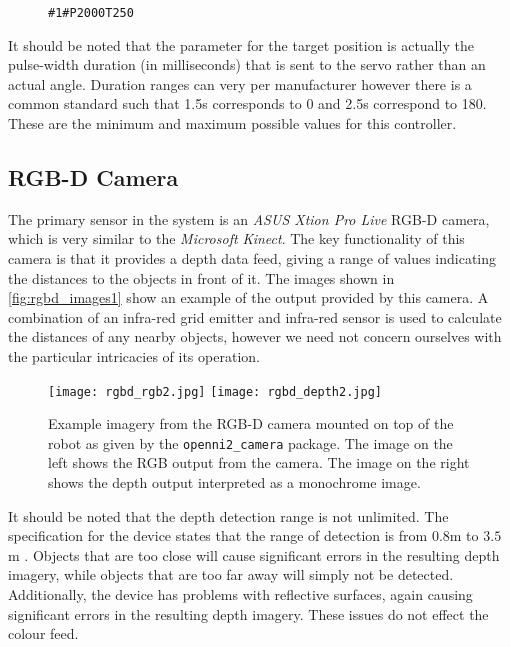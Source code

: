 \begin{figure}[!h]
    \centering
    \texttt{\#1\#P2000T250}
\end{figure}

It should be noted that the parameter for the target position is actually the pulse-width duration (in milliseconds) that is sent to the servo rather than an actual angle. Duration ranges can very per manufacturer however there is a common standard such that 1.5\textmu s corresponds to 0\textdegree{} and 2.5\textmu s correspond to 180\textdegree. These are the minimum and maximum possible values for this controller. 

\subsection{RGB-D Camera}
The primary sensor in the system is an \emph{ASUS Xtion Pro Live} RGB-D camera, which is very similar to the \emph{Microsoft Kinect}. The key functionality of this camera is that it provides a depth data feed, giving a range of values indicating the distances to the objects in front of it. The images shown in \autoref{fig:rgbd_images1} show an example of the output provided by this camera. A combination of an infra-red grid emitter and infra-red sensor is used to calculate the distances of any nearby objects, however we need not concern ourselves with the particular intricacies of its operation.

\begin{figure}[!h]
    \centering
    \texttt{[image: rgbd\_rgb2.jpg]}
    \texttt{[image: rgbd\_depth2.jpg]}
    \caption{Example imagery from the RGB-D camera mounted on top of the robot as given by the \texttt{openni2\_camera} package. The image on the left shows the RGB output from the camera. The image on the right shows the depth output interpreted as a monochrome image.}
    \label{fig:rgbd_images1}
\end{figure}

It should be noted that the depth detection range is not unlimited. The specification for the device states that the range of detection is from $0.8$m to $3.5$m \cite{xtion_spec}. Objects that are too close will cause significant errors in the resulting depth imagery, while objects that are too far away will simply not be detected. Additionally, the device has problems with reflective surfaces, again causing significant errors in the resulting depth imagery. These issues do not effect the colour feed.

